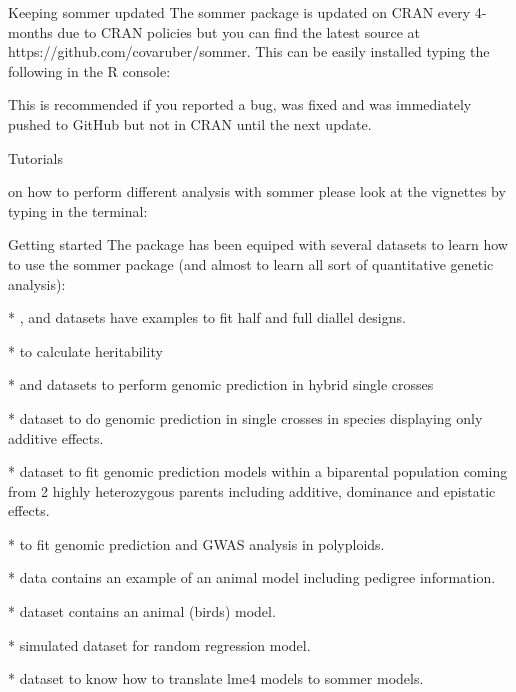 \documentclass[a4paper]{book}
\begin{document}
%
\begin{Section}{Keeping sommer updated}
The sommer package is updated on CRAN every 4-months due to CRAN policies but you can find the latest source at https://github.com/covaruber/sommer. This can be easily installed typing the following in the R console:



This is recommended if you reported a bug, was fixed and was immediately pushed to GitHub but not in CRAN until the next update.
\end{Section}
%
\begin{Section}{Tutorials}

 on how to perform different analysis with sommer please look at the vignettes by typing in the terminal:





\end{Section}
%
\begin{Section}{Getting started}
The package has been equiped with several datasets to learn how to use the sommer package (and almost to learn all sort of quantitative genetic analysis): 

* ,  and  datasets have examples to fit half and full diallel designs. 

*  to calculate heritability

*  and  datasets to perform genomic prediction in hybrid single crosses 

*  dataset to do genomic prediction in single crosses in species displaying only additive effects.

*  dataset to fit genomic prediction models within a biparental population coming from 2 highly heterozygous parents including additive, dominance and epistatic effects. 

*  to fit genomic prediction and GWAS analysis in polyploids. 

*  data contains an example of an animal model including pedigree information.

*  dataset contains an animal (birds) model.

*  simulated dataset for random regression model.

*  dataset to know how to translate lme4 models to sommer models.

\end{Section}
\end{document}
